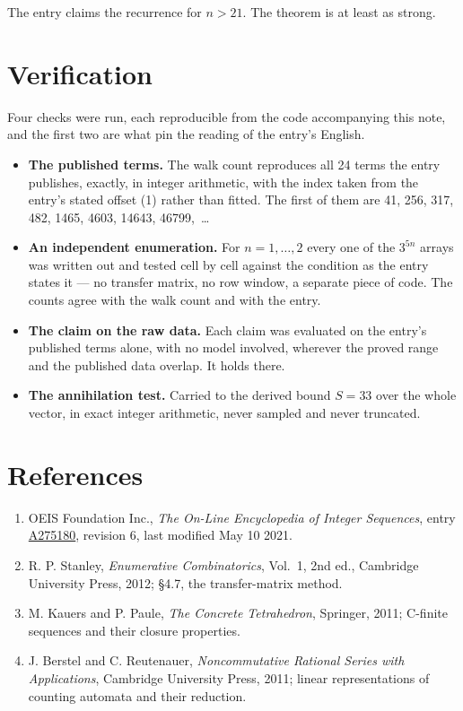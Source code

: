 \documentclass[11pt]{article}
\theoremstyle{definition}
\begin{document}
The entry claims the recurrence for $n > 21$. The theorem is at least as strong.

\section{Verification}

Four checks were run, each reproducible from the code accompanying this note, and the first two are what pin the reading of the entry's English.

\begin{itemize}

\item {\bfseries The published terms.} The walk count reproduces all 24 terms the entry publishes, exactly, in integer arithmetic, with the index taken from the entry's stated offset (1) rather than fitted. The first of them are 41, 256, 317, 482, 1465, 4603, 14643, 46799,~\dots

\item {\bfseries An independent enumeration.} For $n = 1,\dots,2$ every one of the $3^{5n}$ arrays was written out and tested cell by cell against the condition as the entry states it --- no transfer matrix, no row window, a separate piece of code. The counts agree with the walk count and with the entry.

\item {\bfseries The claim on the raw data.} Each claim was evaluated on the entry's published terms alone, with no model involved, wherever the proved range and the published data overlap. It holds there.

\item {\bfseries The annihilation test.} Carried to the derived bound $S = 33$ over the whole vector, in exact integer arithmetic, never sampled and never truncated.

\end{itemize}

\section{References}

\begin{enumerate}

\item OEIS Foundation Inc., \emph{The On-Line Encyclopedia of Integer Sequences}, entry \href{https://oeis.org/A275180}{A275180}, revision 6, last modified May 10 2021.

\item R. P. Stanley, \emph{Enumerative Combinatorics}, Vol.~1, 2nd ed., Cambridge University Press, 2012; \S4.7, the transfer-matrix method.

\item M. Kauers and P. Paule, \emph{The Concrete Tetrahedron}, Springer, 2011; C-finite sequences and their closure properties.

\item J. Berstel and C. Reutenauer, \emph{Noncommutative Rational Series with Applications}, Cambridge University Press, 2011; linear representations of counting automata and their reduction.

\end{enumerate}
\end{document}
